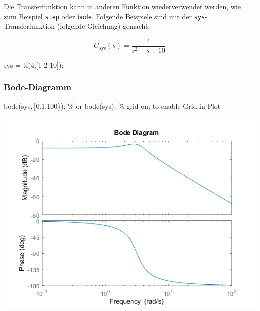 \documentclass[
  10pt,
  a4paper,
  german]{article}
\newenvironment{Shaded}{}{}
\newcommand{\CommentTok}[1]{\textcolor[rgb]{0.42,0.45,0.49}{#1}}
\newcommand{\FloatTok}[1]{\textcolor[rgb]{0.00,0.36,0.77}{#1}}
\newcommand{\NormalTok}[1]{\textcolor[rgb]{0.14,0.16,0.18}{#1}}
\newcommand{\OperatorTok}[1]{\textcolor[rgb]{0.14,0.16,0.18}{#1}}
\newcommand{\VariableTok}[1]{\textcolor[rgb]{0.89,0.38,0.04}{#1}}
\numberwithin{equation}{section}
\begin{document}
\begin{multicols}{2}
Die Transferfunktion kann in anderen Funktion wiederverwendet werden,
wie zum Beispiel \texttt{step} oder \texttt{bode}. Folgende Beispiele
sind mit der \texttt{sys}-Transferfunktion (folgende Gleichung) gemacht.

\[
G_{\text{sys}}(s) = \frac{4}{s^2+s+10}
\]

\begin{Shaded}
\begin{Highlighting}[]
\VariableTok{sys} \OperatorTok{=} \VariableTok{tf}\NormalTok{(}\FloatTok{4}\OperatorTok{,}\NormalTok{[}\FloatTok{1} \FloatTok{2} \FloatTok{10}\NormalTok{])}\OperatorTok{;}
\end{Highlighting}
\end{Shaded}

\hypertarget{bode-diagramm}{%
\subsubsection{Bode-Diagramm}\label{bode-diagramm}}

\begin{Shaded}
\begin{Highlighting}[]
\VariableTok{bode}\NormalTok{(}\VariableTok{sys}\OperatorTok{,}\NormalTok{\{}\FloatTok{0.1}\OperatorTok{,}\FloatTok{100}\NormalTok{\})}\OperatorTok{;} \CommentTok{\% or bode(sys);}
\CommentTok{\% grid on; to enable Grid in Plot}
\end{Highlighting}
\end{Shaded}

\includegraphics{images/matlab_BodePlotResponse.png}

\hypertarget{nyquist-diagramm}{%
}
\end{multicols}
\end{document}
